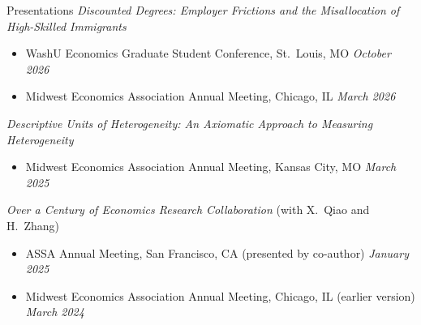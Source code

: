 \documentclass{resume} %
\begin{document}
\begin{rSection}{Presentations}
\textit{Discounted Degrees: Employer Frictions and the Misallocation of High-Skilled Immigrants}
\begin{itemize}
\vspace{-0.25cm}
    \item WashU Economics Graduate Student Conference, St.\ Louis, MO \hfill {\em October 2026}
    \item Midwest Economics Association Annual Meeting, Chicago, IL \hfill {\em March 2026}
\end{itemize}
\textit{Descriptive Units of Heterogeneity: An Axiomatic Approach to Measuring Heterogeneity}
\begin{itemize}
\vspace{-0.25cm}
    \item Midwest Economics Association Annual Meeting, Kansas City, MO \hfill {\em March 2025}
\end{itemize}
\textit{Over a Century of Economics Research Collaboration} (with X.\ Qiao and H.\ Zhang)
\begin{itemize}
\vspace{-0.25cm}
    \item ASSA Annual Meeting, San Francisco, CA (presented by co-author) \hfill {\em January 2025}
    \item Midwest Economics Association Annual Meeting, Chicago, IL (earlier version) \hfill {\em March 2024}
\end{itemize}
\end{rSection}





\end{document}
